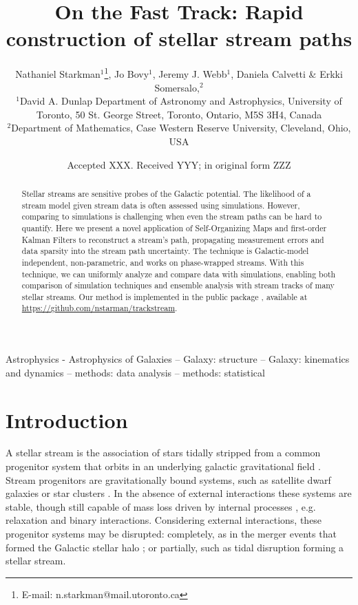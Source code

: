 \documentclass[fleqn,usenatbib]{mnras}
\title{On the Fast Track: Rapid construction of stellar stream paths}
\author[N. Starkman et al.]{ Nathaniel Starkman$^{1}$\thanks{E-mail:
n.starkman@mail.utoronto.ca}, Jo Bovy$^{1}$, Jeremy J. Webb$^{1}$, Daniela
Calvetti \& Erkki Somersalo,$^{2}$ \\
$^{1}$David A. Dunlap Department of Astronomy and Astrophysics, University of
Toronto, 50 St. George Street, Toronto, Ontario, M5S 3H4, Canada\\
$^{2}$Department of Mathematics, Case Western Reserve University, Cleveland,
Ohio, USA\\
}
\date{Accepted XXX. Received YYY; in original form ZZZ}
\begin{document}
\pagerange{\pageref{firstpage}--\pageref{lastpage}}
\maketitle

\begin{abstract}
  Stellar streams are sensitive probes of the Galactic potential. The likelihood
  of a stream model given stream data is often assessed using simulations.
  However, comparing to simulations is challenging when even the stream paths
  can be hard to quantify. Here we present a novel application of
  Self-Organizing Maps and first-order Kalman Filters to reconstruct a stream's
  path, propagating measurement errors and data sparsity into the stream path
  uncertainty. The technique is Galactic-model independent, non-parametric, and
  works on phase-wrapped streams. With this technique, we can uniformly analyze
  and compare data with simulations, enabling both comparison of simulation
  techniques and ensemble analysis with stream tracks of many stellar streams.
  Our method is implemented in the public \python package \trackstream{},
  available at \url{https://github.com/nstarman/trackstream}.
\end{abstract}

\begin{keywords}
  Astrophysics - Astrophysics of Galaxies -- Galaxy: structure -- Galaxy:
  kinematics and dynamics -- methods: data analysis -- methods: statistical
\end{keywords}




\label{firstpage}

\section{Introduction} \label{sec:intro}

  A stellar stream is the association of stars tidally stripped from a common
  progenitor system that orbits in an underlying galactic gravitational field
  \citep{Johnston1998, HelmiWhite1999}. Stream progenitors are gravitationally
  bound systems, such as satellite dwarf galaxies or star clusters
  \citep{Odenkirchen2001, Majewski2003}. In the absence of external interactions
  these systems are stable, though still capable of mass loss driven by internal
  processes \citep{Hills1975, HeggieHut2003}, e.g. relaxation and binary
  interactions. Considering external interactions, these progenitor systems may
  be disrupted: completely, as in the merger events that formed the Galactic
  stellar halo \citep{Lynden-Bell1967, Searle1978}; or partially, such as tidal
  disruption forming a stellar stream.
\end{document}
